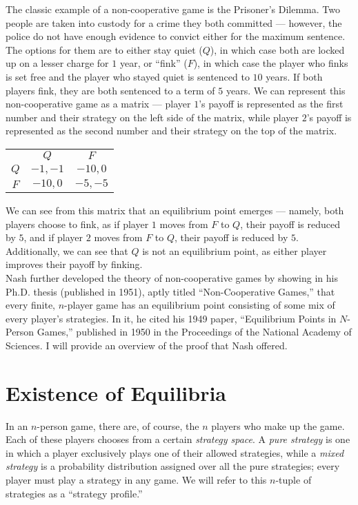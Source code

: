 \documentclass[12pt]{extarticle}
\begin{document}
  The classic example of a non-cooperative game is the Prisoner's Dilemma. Two people are taken into custody for a crime they both committed --- however, the police do not have enough evidence to convict either for the maximum sentence. The options for them are to either stay quiet ($Q$), in which case both are locked up on a lesser charge for $1$ year, or ``fink'' ($F$), in which case the player who finks is set free and the player who stayed quiet is sentenced to $10$ years. If both players fink, they are both sentenced to a term of $5$ years. We can represent this non-cooperative game as a matrix --- player $1$'s payoff is represented as the first number and their strategy on the left side of the matrix, while player $2$'s payoff is represented as the second number and their strategy on the top of the matrix.
  \begin{center}
    \begin{tabular}{c|c|c|}
      \multicolumn{1}{c}{} & \multicolumn{1}{c}{$Q$} & \multicolumn{1}{c}{$F$}\\
      \cline{2-3}
      $Q$ & $-1,-1$ & $-10,0$\\
      \cline{2-3}
      $F$ & $-10,0$ & $-5,-5$\\
      \cline{2-3}
    \end{tabular}
  \end{center}
  We can see from this matrix that an equilibrium point emerges --- namely, both players choose to fink, as if player $1$ moves from $F$ to $Q$, their payoff is reduced by $5$, and if player $2$ moves from $F$ to $Q$, their payoff is reduced by $5$. Additionally, we can see that $Q$ is not an equilibrium point, as either player improves their payoff by finking.\\

  Nash further developed the theory of non-cooperative games by showing in his Ph.D. thesis (published in 1951), aptly titled ``Non-Cooperative Games,''\supercite{nash_non-cooperative_1951} that every finite, $n$-player game has an equilibrium point consisting of some mix of every player's strategies. In it, he cited his 1949 paper, ``Equilibrium Points in $N$-Person Games,''\supercite{nash_equilibrium_1950} published in 1950 in the Proceedings of the National Academy of Sciences. I will provide an overview of the proof that Nash offered.
  \section*{Existence of Equilibria}%
  In an $n$-person game, there are, of course, the $n$ players who make up the game. Each of these players chooses from a certain \textit{strategy space}. A \textit{pure strategy} is one in which a player exclusively plays one of their allowed strategies, while a \textit{mixed strategy} is a probability distribution assigned over all the pure strategies; every player must play a strategy in any game. We will refer to this $n$-tuple of strategies as a ``strategy profile.''\\
\end{document}
